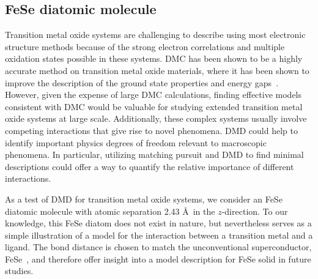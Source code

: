 \subsection{FeSe diatomic molecule}
\label{subsection:fese}
Transition metal oxide systems are challenging to describe using most electronic structure methods because of the strong electron correlations and multiple oxidation states possible in these systems. %
DMC has been shown to be a highly accurate method on transition metal oxide materials, where it has been shown to improve the description of the ground state properties and energy gaps~\cite{Foyevtsova2014, Wagner_Abbamonte, Zheng2015, Wagner2016}. %
However, given the expense of large DMC calculations, finding effective models consistent with DMC would be valuable for studying extended transition metal oxide systems at large scale.
Additionally, these complex systems usually involve competing interactions that give rise to novel phenomena. 
DMD could help to identify important physics degrees of freedom relevant to macroscopic phenomena.
In particular, utilizing matching pursuit and DMD to find minimal descriptions could offer a way to quantify the relative importance of different interactions.

As a test of DMD for transition metal oxide systems, we consider an FeSe diatomic molecule with atomic separation 2.43 \AA~in the $z$-direction.
To our knowledge, this FeSe diatom does not exist in nature, but nevertheless serves as a simple illustration of a model for the interaction between a transition metal and a ligand. 
The bond distance is chosen to match the unconventional superconductor, FeSe~\cite{kumar_crystal_2010}, and therefore offer insight into a model description for FeSe solid in future studies.

